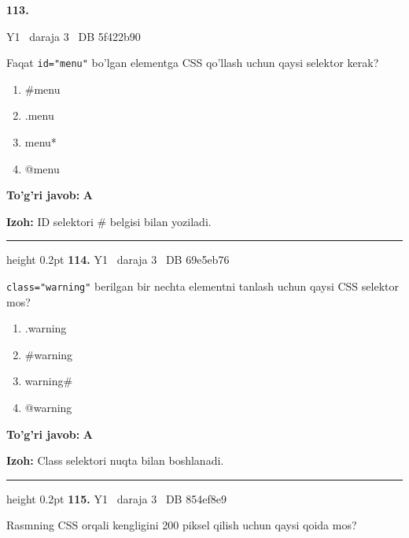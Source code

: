 \documentclass[10pt,a4paper,oneside]{article}
\begin{document}
\hypertarget{q113}{\textbf{\color{ink}113.}}  {\color{muted}\scriptsize Y1 \textbullet\ daraja 3 \textbullet\ DB 5f422b90}
\par
Faqat \texttt{id="menu"} bo'lgan elementga CSS qo'llash uchun qaysi selektor kerak?
\begin{enumerate}[label=\Alph*),leftmargin=9mm]
\item \#menu
\item .menu
\item menu*
\item @menu
\end{enumerate}
\begin{tcolorbox}[enhanced,breakable,colback=teal!4,colframe=teal!45!black,boxrule=0.45pt,arc=1.2mm,left=2.8mm,right=2.8mm,top=2mm,bottom=2mm,before skip=2mm,after skip=2mm]
\textbf{\color{teal}To'g'ri javob:} \textbf{A}
\par\smallskip
\textbf{Izoh:} ID selektori \# belgisi bilan yoziladi.
\end{tcolorbox}
\vspace{2mm}\hrule height 0.2pt \vspace{4mm}
\hypertarget{q114}{\textbf{\color{ink}114.}}  {\color{muted}\scriptsize Y1 \textbullet\ daraja 3 \textbullet\ DB 69e5eb76}
\par
\texttt{class="warning"} berilgan bir nechta elementni tanlash uchun qaysi CSS selektor mos?
\begin{enumerate}[label=\Alph*),leftmargin=9mm]
\item .warning
\item \#warning
\item warning\#
\item @warning
\end{enumerate}
\begin{tcolorbox}[enhanced,breakable,colback=teal!4,colframe=teal!45!black,boxrule=0.45pt,arc=1.2mm,left=2.8mm,right=2.8mm,top=2mm,bottom=2mm,before skip=2mm,after skip=2mm]
\textbf{\color{teal}To'g'ri javob:} \textbf{A}
\par\smallskip
\textbf{Izoh:} Class selektori nuqta bilan boshlanadi.
\end{tcolorbox}
\vspace{2mm}\hrule height 0.2pt \vspace{4mm}
\hypertarget{q115}{\textbf{\color{ink}115.}}  {\color{muted}\scriptsize Y1 \textbullet\ daraja 3 \textbullet\ DB 854ef8e9}
\par
Rasmning CSS orqali kengligini 200 piksel qilish uchun qaysi qoida mos?
\end{document}
